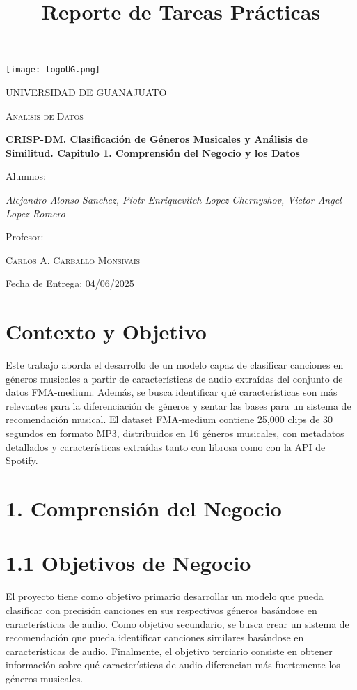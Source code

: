 \documentclass{article}
\title{Reporte de Tareas Prácticas}
\newcommand{\institucion}{UNIVERSIDAD DE GUANAJUATO}
\newcommand{\materia}{Analisis de Datos}
\newcommand{\profesor}{Carlos A. Carballo Monsivais}
\newcommand{\nombreTarea}{CRISP-DM. Clasificación de Géneros Musicales y Análisis de Similitud. Capitulo 1. Comprensión del Negocio y los Datos}
\newcommand{\estudiante}{Alejandro Alonso Sanchez, Piotr Enriquevitch Lopez Chernyshov, Victor Angel Lopez Romero}
\newcommand{\fechaEntrega}{Fecha de Entrega: 04/06/2025}
\begin{document}
\begin{titlepage}
    \centering
    \texttt{[image: logoUG.png]}\par\vspace{1cm}
    {\scshape\LARGE \institucion \par}
    \vspace{1cm}
    {\scshape\Large \materia \par}
    \vspace{1.5cm}
    {\scshape\bfseries \numeroTarea \par}
    \vspace{1.5cm}
    {\huge\bfseries \nombreTarea \par}
    \vspace{2cm}
    Alumnos: \par
    {\Large\itshape \estudiante \par}
    \vfill
    Profesor:\par
    \textsc{\profesor}
    \vfill
    {\large \fechaEntrega\par}
\end{titlepage}

\section*{Contexto y Objetivo}
Este trabajo aborda el desarrollo de un modelo capaz de clasificar canciones en géneros musicales a partir de características de audio extraídas del conjunto de datos FMA-medium. Además, se busca identificar qué características son más relevantes para la diferenciación de géneros y sentar las bases para un sistema de recomendación musical. El dataset FMA-medium contiene 25,000 clips de 30 segundos en formato MP3, distribuidos en 16 géneros musicales, con metadatos detallados y características extraídas tanto con librosa como con la API de Spotify.

\section*{1. Comprensión del Negocio}

\section*{1.1 Objetivos de Negocio}
El proyecto tiene como objetivo primario desarrollar un modelo que pueda clasificar con precisión canciones en sus respectivos géneros basándose en características de audio. Como objetivo secundario, se busca crear un sistema de recomendación que pueda identificar canciones similares basándose en características de audio. Finalmente, el objetivo terciario consiste en obtener información sobre qué características de audio diferencian más fuertemente los géneros musicales.
\end{document}
